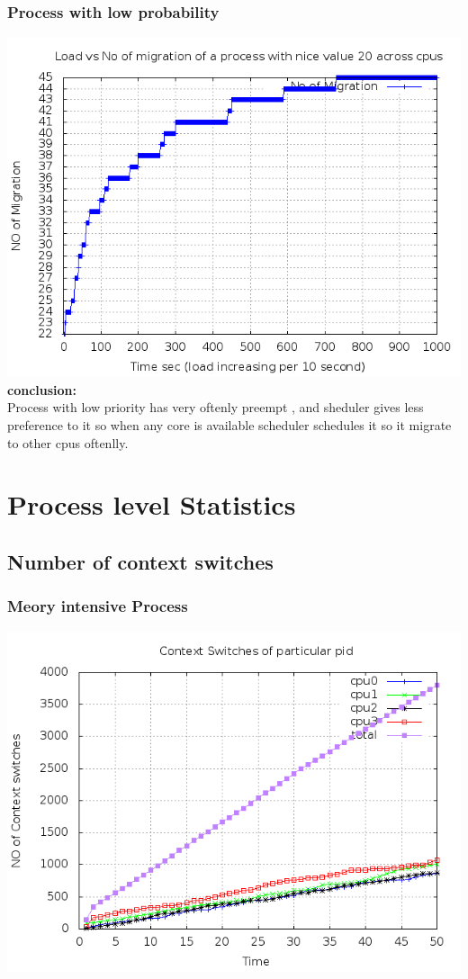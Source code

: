 \documentclass[a4paper,11pt]{report}
\begin{document}
 \subsubsection{Process with low probability}
 \includegraphics[scale=0.5]{miglow.png}\\
  {\bf conclusion:} \\Process with low priority has very oftenly preempt , and sheduler gives less preference to it so when any core is available scheduler schedules it so it migrate to other cpus oftenlly.
 \section{Process level Statistics}
 \subsection{Number of context switches}
 \subsubsection{Meory intensive Process}
 \includegraphics[scale=0.5]{pidcs.png}\\
\end{document}
